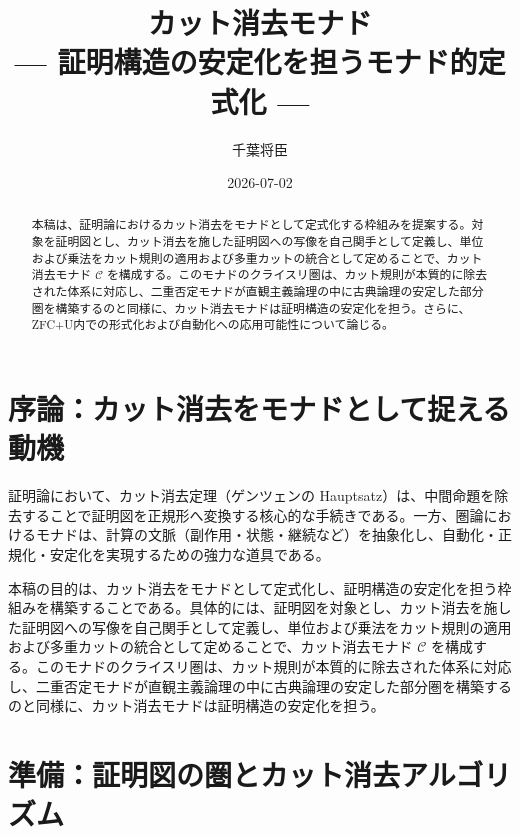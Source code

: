 \documentclass[11pt,a4paper]{article}
\theoremstyle{definition}
\newcommand{\monad}{\mathcal{C}}
\begin{document}
\title{カット消去モナド\\
--- 証明構造の安定化を担うモナド的定式化 ---}
\author{千葉将臣}
\date{2026-07-02}

\maketitle

\begin{abstract}
本稿は、証明論におけるカット消去をモナドとして定式化する枠組みを提案する。対象を証明図とし、カット消去を施した証明図への写像を自己関手として定義し、単位および乗法をカット規則の適用および多重カットの統合として定めることで、カット消去モナド $\monad$ を構成する。このモナドのクライスリ圏は、カット規則が本質的に除去された体系に対応し、二重否定モナドが直観主義論理の中に古典論理の安定した部分圏を構築するのと同様に、カット消去モナドは証明構造の安定化を担う。さらに、ZFC+U内での形式化および自動化への応用可能性について論じる。
\end{abstract}

\tableofcontents
\newpage

\section{序論：カット消去をモナドとして捉える動機}

証明論において、カット消去定理（ゲンツェンの Hauptsatz）は、中間命題を除去することで証明図を正規形へ変換する核心的な手続きである。一方、圏論におけるモナドは、計算の文脈（副作用・状態・継続など）を抽象化し、自動化・正規化・安定化を実現するための強力な道具である。

本稿の目的は、カット消去をモナドとして定式化し、証明構造の安定化を担う枠組みを構築することである。具体的には、証明図を対象とし、カット消去を施した証明図への写像を自己関手として定義し、単位および乗法をカット規則の適用および多重カットの統合として定めることで、カット消去モナド $\monad$ を構成する。このモナドのクライスリ圏は、カット規則が本質的に除去された体系に対応し、二重否定モナドが直観主義論理の中に古典論理の安定した部分圏を構築するのと同様に、カット消去モナドは証明構造の安定化を担う。

\section{準備：証明図の圏とカット消去アルゴリズム}
\end{document}

